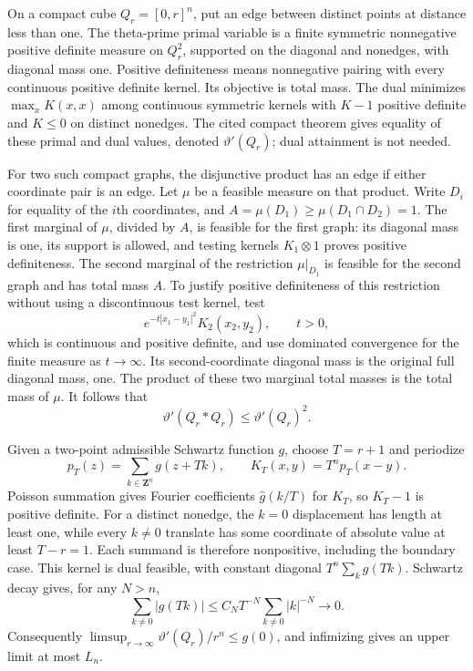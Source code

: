 \documentclass[11pt]{article}
\newcommand{\Z}{\mathbf Z}
\begin{document}
On a compact cube $Q_r=[0,r]^n$, put an edge between distinct points at distance less than one. The theta-prime primal variable is a finite symmetric nonnegative positive definite measure on $Q_r^2$, supported on the diagonal and nonedges, with diagonal mass one. Positive definiteness means nonnegative pairing with every continuous positive definite kernel. Its objective is total mass. The dual minimizes $\max_x K(x,x)$ among continuous symmetric kernels with $K-1$ positive definite and $K\le0$ on distinct nonedges. The cited compact theorem gives equality of these primal and dual values, denoted $\vartheta'(Q_r)$; dual attainment is not needed.

For two such compact graphs, the disjunctive product has an edge if either coordinate pair is an edge. Let $\mu$ be a feasible measure on that product. Write $D_i$ for equality of the $i$th coordinates, and $A=\mu(D_1)\ge\mu(D_1\cap D_2)=1$. The first marginal of $\mu$, divided by $A$, is feasible for the first graph: its diagonal mass is one, its support is allowed, and testing kernels $K_1\otimes1$ proves positive definiteness. The second marginal of the restriction $\mu|_{D_1}$ is feasible for the second graph and has total mass $A$. To justify positive definiteness of this restriction without using a discontinuous test kernel, test
\[
 e^{-t|x_1-y_1|^2}K_2(x_2,y_2),\qquad t>0,
\]
which is continuous and positive definite, and use dominated convergence for the finite measure as $t\to\infty$. Its second-coordinate diagonal mass is the original full diagonal mass, one. The product of these two marginal total masses is the total mass of $\mu$. It follows that
\begin{equation}\label{eq:theta-product}
 \vartheta'(Q_r\mathbin{*}Q_r)\le\vartheta'(Q_r)^2.
\end{equation}

Given a two-point admissible Schwartz function $g$, choose $T=r+1$ and periodize
\[
 p_T(z)=\sum_{k\in\Z^n}g(z+Tk),\qquad K_T(x,y)=T^n p_T(x-y).
\]
Poisson summation gives Fourier coefficients $\widehat g(k/T)$ for $K_T$, so $K_T-1$ is positive definite. For a distinct nonedge, the $k=0$ displacement has length at least one, while every $k\ne0$ translate has some coordinate of absolute value at least $T-r=1$. Each summand is therefore nonpositive, including the boundary case. This kernel is dual feasible, with constant diagonal $T^n\sum_k g(Tk)$. Schwartz decay gives, for any $N>n$,
\[
 \sum_{k\ne0}|g(Tk)|\le C_N T^{-N}\sum_{k\ne0}|k|^{-N}\longrightarrow0.
\]
Consequently $\limsup_{r\to\infty}\vartheta'(Q_r)/r^n\le g(0)$, and infimizing gives an upper limit at most $L_n$.
\end{document}
